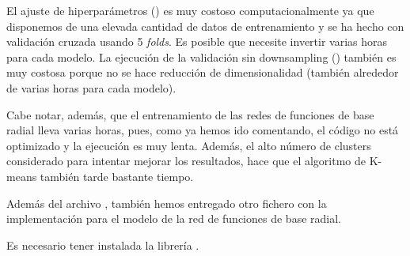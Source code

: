 \documentclass[a4]{article}
\begin{document}
El ajuste de hiperparámetros () es muy costoso computacionalmente ya que disponemos de una elevada cantidad de datos de entrenamiento y se ha hecho con validación cruzada usando 5 \textit{folds}. Es posible que necesite invertir varias horas para cada modelo. La ejecución de la validación sin downsampling () también es muy costosa porque no se hace reducción de dimensionalidad (también alrededor de varias horas para cada modelo). 

Cabe notar, además, que el entrenamiento de las redes de funciones de base radial lleva varias horas, pues, como ya hemos ido comentando, el código no está optimizado y la ejecución es muy lenta. Además, el alto número de clusters considerado para intentar mejorar los resultados, hace que el algoritmo de K-means también tarde bastante tiempo. 

Además del archivo , también hemos entregado otro fichero  con la implementación para el modelo de la red de funciones de base radial.

Es necesario tener instalada la librería . 
\end{document}

